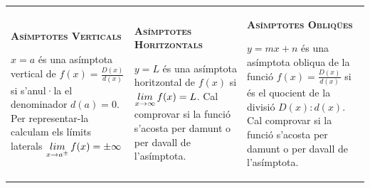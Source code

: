  \newpage
\vspace*{-0.25cm}
\begin{center}
 	\setlength\LTleft{0pt}
	\setlength\LTright{0pt}
	\fontsize{10.5}{11}
	\begin{longtable}[h]{|p{}|p{}|p{}|}
		\hline %
		\rowcolor{lightgray} 	\multicolumn{3}{|l|}{\textbf{\textsc{Asímptotes}}} \\   [0.5ex]   \hline		
		\textsc{\bf Asímptotes Verticals}
		
		$x=a$ és una asímptota vertical de $f(x)=\frac{D(x)}{d(x)}$ si s'anul·la el denominador $d(a)=0$. Per representar-la calculam els límits laterals $\mathop{lim}\limits_{x\to a^{\pm}} f(x)=\pm \infty$
		&
		
		\textsc{\bf Asímptotes Horitzontals}
		
		$y=L$ és una asímptota horitzontal de $f(x)$ si $\mathop{lim}\limits_{x\to \infty} f(x)=L$. Cal comprovar si la funció s'acosta per damunt o per davall de l'asímptota.
		&
		\textsc{\bf Asímptotes Obliqües}
		
		$y=mx+n$ és una asímptota obliqua de la funció $f(x)=\frac{D(x)}{d(x)}$  si és el quocient de la divisió $D(x):d(x)$. Cal comprovar si la funció s'acosta per damunt o per davall de l'asímptota.
		
		 \\ [0.5ex] \hline
	\end{longtable}
\end{center}
\vspace{-0.5cm}
